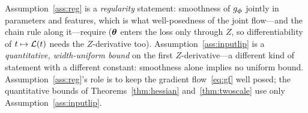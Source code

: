 \begin{remark}
Assumption~\ref{ass:reg} is a \emph{regularity} statement:
smoothness of $g_{\boldsymbol{\phi}}$ jointly in parameters and features, which
is what well-posedness of the joint flow---and the chain rule along
it---require (${\boldsymbol{\theta}}$ enters the loss only through $Z$, so
differentiability of $t \mapsto \mathcal{L}(t)$ needs the $Z$-derivative
too). Assumption~\ref{ass:inputlip} is a \emph{quantitative,
width-uniform bound} on the first $Z$-derivative---a different kind
of statement with a different constant: smoothness alone implies no
uniform bound. Assumption~\ref{ass:reg}'s role is to keep the
gradient flow~\eqref{eq:gf} well posed; the quantitative bounds of
Theorems~\ref{thm:hessian} and~\ref{thm:twoscale} use only
Assumption~\ref{ass:inputlip}.


\end{remark}
